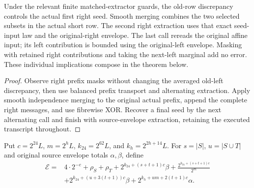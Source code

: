 \begin{theorem}
  \label{thm:lowerbounds-algebraic-affine-round-stages}
  \leanok
  Under the relevant finite matched-extractor guards, the old-row
  discrepancy controls the actual first right seed. Smooth merging
  combines the two selected subsets in the actual short row. The second
  right extraction uses that exact seed-input law and the original-right
  envelope. The last call rereads the original affine input; its left
  contribution is bounded using the original-left envelope. Masking with
  retained right contributions and taking the next-left marginal add no
  error. These individual implications compose in the theorem below.
\end{theorem}
\begin{proof}
  \leanok
  Observe right prefix masks without changing the averaged old-left
  discrepancy, then use balanced prefix transport and alternating
  extraction. Apply smooth independence merging to the original actual
  prefix, append the complete right messages, and use fibrewise XOR.
  Recover a final seed by the next alternating call and finish with
  source-envelope extraction, retaining the executed transcript throughout.
\end{proof}

\begin{definition}
  \label{def:lowerbounds-algebraic-affine-round-error}
  \leanok
  Put $c=2^{24}L$, $m=2^hL$, $k_{24}=2^{62}L$, and
  $k_h=2^{2h+14}L$. For $s=|S|$, $u=|S\cup T|$ and original source
  envelope totals $\alpha,\beta$, define
  \begin{align*}
    \mathcal E={}&4\cdot2^{-e}+\rho_S+\rho_T
      +2^{k_{24}+(s+t+1)c}\beta
      +\frac{2^{k_{24}+(s+t+1)c}}{2^m}\\
      &+2^{k_{24}+(u+3(t+1))c}\beta
      +2^{k_h+um+2(t+1)c}\alpha.
  \end{align*}
\end{definition}


